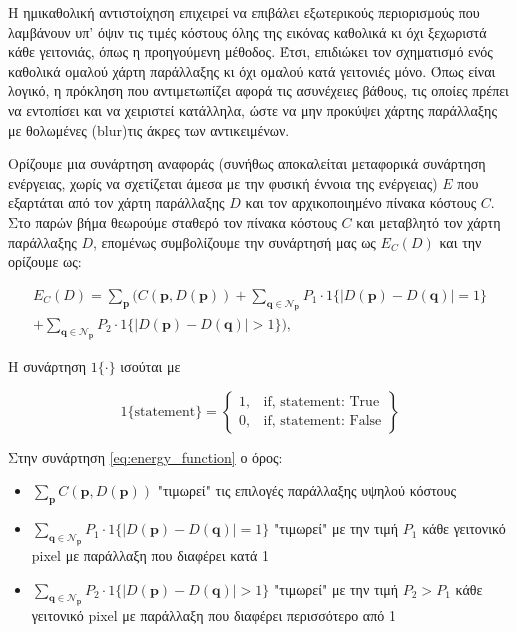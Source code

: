 Η ημικαθολική αντιστοίχηση επιχειρεί να επιβάλει εξωτερικούς περιορισμούς που λαμβάνουν υπ' όψιν τις τιμές κόστους όλης της εικόνας καθολικά κι όχι ξεχωριστά κάθε γειτονιάς, όπως η προηγούμενη μέθοδος. Έτσι, επιδιώκει τον σχηματισμό ενός καθολικά ομαλού χάρτη παράλλαξης κι όχι ομαλού κατά γειτονιές μόνο. Όπως είναι λογικό, η πρόκληση που αντιμετωπίζει αφορά τις ασυνέχειες βάθους, τις οποίες πρέπει να εντοπίσει και να χειριστεί κατάλληλα, ώστε να μην προκύψει χάρτης παράλλαξης με θολωμένες \e (blur)\g τις άκρες των αντικειμένων.

Ορίζουμε μια συνάρτηση αναφοράς (συνήθως αποκαλείται μεταφορικά συνάρτηση ενέργειας, χωρίς να σχετίζεται άμεσα με την φυσική έννοια της ενέργειας) $E$ που εξαρτάται από τον χάρτη παράλλαξης $D$ και τον αρχικοποιημένο πίνακα κόστους $C$. Στο παρών βήμα θεωρούμε σταθερό τον πίνακα κόστους $C$ και μεταβλητό τον χάρτη παράλλαξης $D$, επομένως συμβολίζουμε την συνάρτησή μας ως $E_C(D)$ και την ορίζουμε ως:

\begin{multline}
\label{eq:energy_function}
E_C(D) = \sum_{\mathbf{p}} \biggl( C(\mathbf{p}, D(\mathbf{p}))
+ \sum_{\mathbf{q} \in \mathcal{N}_{\mathbf{p}}} P_1 \cdot 1\{|D(\mathbf{p}) - D(\mathbf{q})| = 1\} \\
+ \sum_{\mathbf{q} \in \mathcal{N}_{\mathbf{p}}} P_2 \cdot 1\{|D(\mathbf{p}) - D(\mathbf{q})| > 1\} \biggr), 
\end{multline}

Η συνάρτηση $1\{\cdot\}$ ισούται με \e
  
\[
1 \{ \text{statement} \} =
 	\left\{\begin{array}{lr}
	1 , & \text{if, statement: True} \\ 
	0 , & \text{if, statement: False}
\end{array}\right\}
\]

\g 

Στην συνάρτηση \ref{eq:energy_function} ο όρος:

\begin{itemize}
	\item $\sum_{\mathbf{p}} C(\mathbf{p}, D(\mathbf{p}))$ "τιμωρεί" τις επιλογές παράλλαξης υψηλού κόστους
	\item $\sum_{\mathbf{q} \in \mathcal{N}_{\mathbf{p}}} P_1 \cdot 1\{|D(\mathbf{p}) - D(\mathbf{q})| = 1\}$ "τιμωρεί" με την τιμή $P_1$ κάθε γειτονικό \e pixel \g με παράλλαξη που διαφέρει κατά 1
	\item $\sum_{\mathbf{q} \in \mathcal{N}_{\mathbf{p}}} P_2 \cdot 1\{|D(\mathbf{p}) - D(\mathbf{q})| > 1\}$ "τιμωρεί" με την τιμή $P_2>P_1$ κάθε γειτονικό \e pixel \g με παράλλαξη που διαφέρει περισσότερο από 1
\end{itemize}

